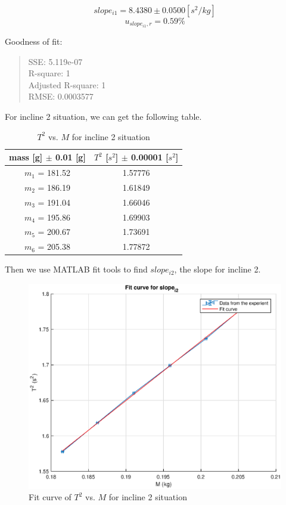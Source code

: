 $$slope_{i1} = 8.4380 \pm 0.0500 [s^2/kg] $$
$$ u_{slope_{i1},r} = 0.59 \% $$

Goodness of fit:
\begin{quote}
	\centering
  SSE: 5.119e-07 		\\ 
  R-square: 1 			\\ 
  Adjusted R-square: 1 	\\ 
  RMSE: 0.0003577 		\\ 
\end{quote}

For incline 2 situation, we can get the following table.

\begin{table}[H]
	\centering
	\begin{tabular}{|c|c|}
	\hline
	mass [g] $\pm$ 0.01 [g] & $T^2$ [$s^2$] $\pm$ 0.00001 [$s^2$] \\ \hline
	$m_1$ = 181.52  & 1.57776 \\ \hline
	$m_2$ = 186.19  & 1.61849 \\ \hline
	$m_3$ = 191.04  & 1.66046 \\ \hline
	$m_4$ = 195.86  & 1.69903 \\ \hline
	$m_5$ = 200.67  & 1.73691 \\ \hline
	$m_6$ = 205.38  & 1.77872 \\ \hline
	\end{tabular}
	\caption{$T^2$ vs. $M$ for incline 2 situation}
\label{T2vsM_2}
\end{table}

Then we use MATLAB fit tools to find $slope_{i2}$, the slope for incline 2.

\begin{figure}[H]
	\centering
	\includegraphics[width=13cm]{matlab/fitfig/m3}
	\caption{Fit curve of $T^2$ vs. $M$ for incline 2 situation}
\end{figure}

